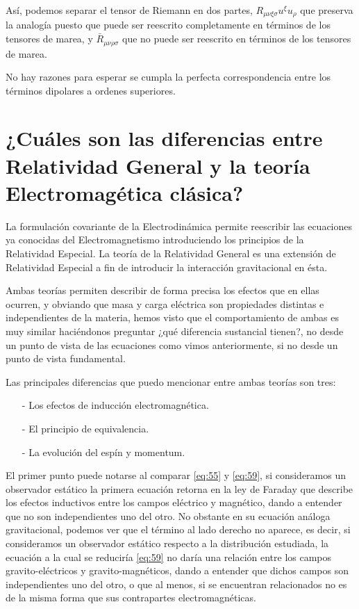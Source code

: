 Así, podemos separar el tensor de Riemann en dos partes, $R_{\mu \nu \xi \sigma} u^{\xi} u_{\rho}$ que preserva la analogía puesto que puede ser reescrito completamente en términos de los tensores de marea, y $\bar{R}_{\mu \nu \rho \sigma}$ que no puede ser reescrito en términos de los tensores de marea.

No hay razones para esperar se cumpla la perfecta correspondencia entre los términos dipolares a ordenes superiores.

\section{¿Cuáles son las diferencias entre Relatividad General y la teoría Electromagética clásica?}

La formulación covariante de la Electrodinámica permite reescribir las ecuaciones ya conocidas del Electromagnetismo introduciendo los principios de la Relatividad Especial. La teoría de la Relatividad General es una extensión de Relatividad Especial a fin de introducir la interacción gravitacional en ésta.

Ambas teorías permiten describir de forma precisa los efectos que en ellas ocurren, y obviando que masa y carga eléctrica son propiedades distintas e independientes de la materia, hemos visto que el comportamiento de ambas es muy similar haciéndonos preguntar ¿qué diferencia sustancial tienen?, no desde un punto de vista de las ecuaciones como vimos anteriormente, si no desde un punto de vista fundamental.

Las principales diferencias que puedo mencionar entre ambas teorías son tres:
\begin{itemize}
\item[-] Los efectos de inducción electromagnética.
\item[-] El principio de equivalencia.
\item[-] La evolución del espín y momentum.
\end{itemize}

El primer punto puede notarse al comparar \eqref{eq:55} y \eqref{eq:59}, si consideramos un observador estático la primera ecuación retorna en la ley de Faraday que describe los efectos inductivos entre los campos eléctrico y magnético, dando a entender que no son independientes uno del otro. No obstante en su ecuación análoga gravitacional, podemos ver que el término al lado derecho no aparece, es decir, si consideramos un observador estático respecto a la distribución estudiada, la ecuación a la cual se reduciría \eqref{eq:59} no daría una relación entre los campos gravito-eléctricos y gravito-magnéticos, dando a entender que dichos campos son independientes uno del otro, o que al menos, si se encuentran relacionados no es de la misma forma que sus contrapartes electromagnéticas.

